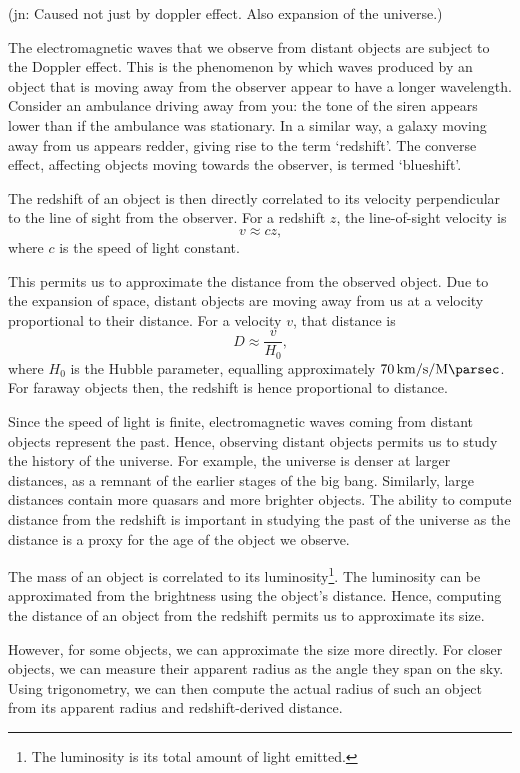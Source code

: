 \documentclass[11pt,twoside,openright]{report}
\newcommand\jn[1]{{\color{red}(jn: #1)}}
\begin{document}
  \jn{Caused not just by doppler effect. Also expansion of the universe.}

  The electromagnetic waves that we observe from distant objects are subject to the Doppler effect. This is the phenomenon by which waves produced by an object that is moving away from the observer appear to have a longer wavelength. Consider an ambulance driving away from you: the tone of the siren appears lower than if the ambulance was stationary. In a similar way, a galaxy moving away from us appears redder, giving rise to the term `redshift'. The converse effect, affecting objects moving towards the observer, is termed `blueshift'.

  The redshift of an object is then directly correlated to its velocity perpendicular to the line of sight from the observer. For a redshift $z$, the line-of-sight velocity is\[
      v \approx cz \text{,}
  \] where $c$ is the speed of light constant.

  This permits us to approximate the distance from the observed object. Due to the expansion of space, distant objects are moving away from us at a velocity proportional to their distance. For a velocity $v$, that distance is \[
      D \approx \frac{v}{H_0} \text{,}
  \] where $H_0$ is the Hubble parameter, equalling approximately $\SI{70}{\kilo\meter\per\second\per\mega\parsec}$. For faraway objects then, the redshift is hence proportional to distance.

  Since the speed of light is finite, electromagnetic waves coming from distant objects represent the past. Hence, observing distant objects permits us to study the history of the universe. For example, the universe is denser at larger distances, as a remnant of the earlier stages of the big bang. Similarly, large distances contain more quasars and more brighter objects. The ability to compute distance from the redshift is important in studying the past of the universe as the distance is a proxy for the age of the object we observe.

  The mass of an object is correlated to its luminosity\footnote{The luminosity is its total amount of light emitted.}. The luminosity can be approximated from the brightness using the object's distance. Hence, computing the distance of an object from the redshift permits us to approximate its size.

  However, for some objects, we can approximate the size more directly. For closer objects, we can measure their apparent radius as the angle they span on the sky. Using trigonometry, we can then compute the actual radius of such an object from its apparent radius and redshift-derived distance.
\end{document}
